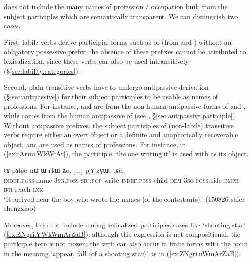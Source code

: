  does not include the many names of profession / occupation built from the subject participles which are semantically transparent. We can distinguish two cases. 

First, labile verbs derive participial forms such as  or  (from  and ) without an obligatory possessive prefix; the absence of these prefixes cannot be attributed to lexicalization, since these verbs can also be used intransitively (§\ref{sec:lability.categories}). 

Second, plain transitive verbs have to undergo antipassive derivation (§\ref{sec:antipassive}) for their subject participles to be usable as names of professions. For instance,  and  are from the  non-human antipassive forms of  and , while   comes from the  human antipassive of (see , §\ref{sec:antipassive.participle}). Without antipassive prefixes, the subject participles of (non-labile) transitive verbs require either an overt object or a definite and anaphorically recoverable object, and are used as names of professions. For instance, in (\ref{ex:tArmi.WkWrAt}), the participle  `the one writing it' is used with  as its object.

\begin{exe}
\ex \label{ex:tArmi.WkWrAt}
  tɤ-pɤtso nɯ ɯ-rkɯ ʑo, [...] pjɤ-zɣɯt tɕe, \\
 \textsc{indef}.\textsc{poss}-name \textsc{3sg}.\textsc{poss}-\textsc{sbj}:\textsc{pcp}-write  \textsc{indef}.\textsc{poss}-child \textsc{dem} \textsc{3sg}.\textsc{poss}-side \textsc{emph} { } \textsc{ifr}-reach \textsc{lnk} \\
\glt `It arrived near the boy who wrote the names (of the contestants).' (150826 shier shengxiao)
\end{exe}

Moreover, I do not include among lexicalized participles cases like `shooting star' (\ref{ex:ZNgri.YWkWmArZaB}): although this expression is not compositional, the participle here is not frozen; the verb  can also occur in finite forms with the noun  in the meaning `appear, fall (of a shooting star)' as in (\ref{ex:ZNgri.nWmArZaB}).

